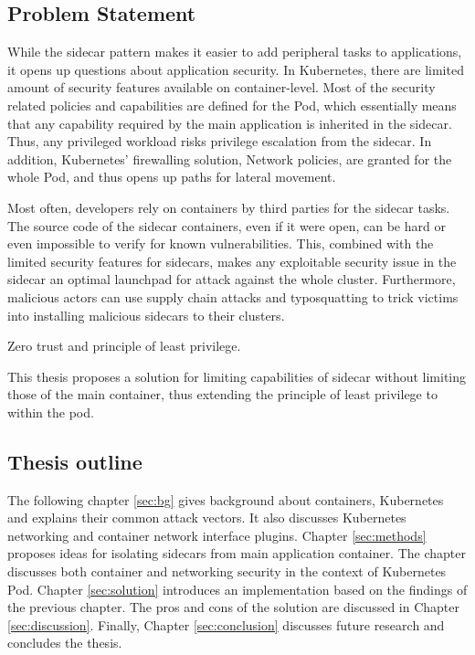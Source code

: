 \documentclass[english, 12pt, a4paper, sci, utf8, a-2b, online]{aaltothesis}
\begin{document}
\subsection{Problem Statement}

While the sidecar pattern makes it easier to add peripheral tasks to applications, it opens up questions about application security. In Kubernetes, there are limited amount of security features available on container-level. Most of the security related policies and capabilities are defined for the Pod, which essentially means that any capability required by the main application is inherited in the sidecar. Thus, any privileged workload risks privilege escalation from the sidecar. In addition, Kubernetes' firewalling solution, Network policies, are granted for the whole Pod, and thus opens up paths for lateral movement.

Most often, developers rely on containers by third parties for the sidecar tasks. The source code of the sidecar containers, even if it were open, can be hard or even impossible to verify for known vulnerabilities. This, combined with the limited security features for sidecars, makes any exploitable security issue in the sidecar an optimal launchpad for attack against the whole cluster. Furthermore, malicious actors can use supply chain attacks and typosquatting to trick victims into installing malicious sidecars to their clusters.

Zero trust and principle of least privilege.

This thesis proposes a solution for limiting capabilities of sidecar without limiting those of the main container, thus extending the principle of least privilege to within the pod.

\subsection{Thesis outline}

The following chapter \ref{sec:bg} gives background about containers, Kubernetes and explains their common attack vectors. It also discusses Kubernetes networking and container network interface plugins. Chapter \ref{sec:methods} proposes ideas for isolating sidecars from main application container. The chapter discusses both container and networking security in the context of Kubernetes Pod. Chapter \ref{sec:solution} introduces an implementation based on the findings of the previous chapter. The pros and cons of the solution are discussed in Chapter \ref{sec:discussion}. Finally, Chapter \ref{sec:conclusion} discusses future research and concludes the thesis.
\end{document}
